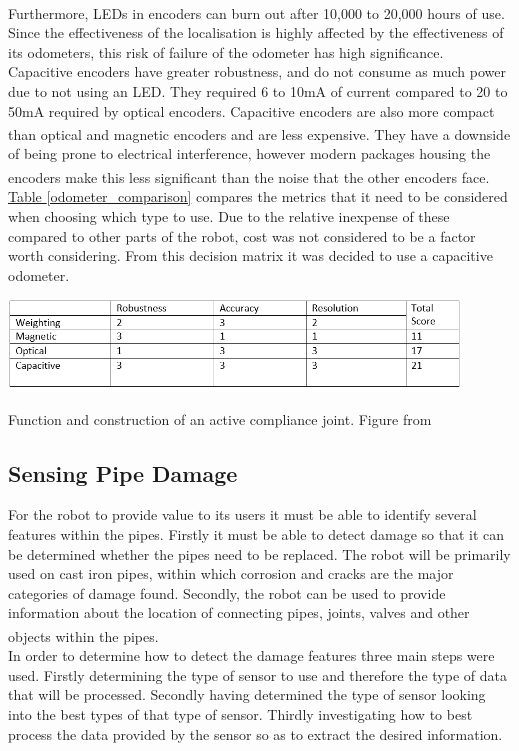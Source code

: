 \documentclass[11pt]{article}		%
\newcommand{\supercite}[1]{\textsuperscript{\cite{#1}}}		%
\newcommand{\tableref}[1]{\hyperref[#1]{Table \ref*{#1}}}     %
\begin{document}
	        Furthermore, LEDs in encoders can burn out after 10,000 to 20,000 hours of use.\supercite{Encoders} 
	        Since the effectiveness of the localisation is highly affected by  the effectiveness of its odometers, this risk of failure of the odometer has high significance.
	        \\
	        Capacitive encoders have greater robustness, and do not consume as much power due to not using an LED. 
	        They required 6 to 10mA of current compared to 20 to 50mA required by optical encoders.
	        Capacitive encoders are also more compact than optical and magnetic encoders and are less expensive\supercite{Encoders}. 
	        They have a downside of being prone to electrical interference, however modern packages housing the encoders make this less significant than the noise that the other encoders face.\supercite{Encoders}
	        \\
	        \tableref{odometer_comparison} compares the metrics that it need to be considered when choosing which type to use. 
	        Due to the relative inexpense of these compared to other parts of the robot, cost was not considered to be a factor worth considering. 
	        From this decision matrix it was decided to use a capacitive odometer. 
	        \begin{table}[h]
						\centering
							\includegraphics[width=0.9\textwidth]{Table_comparing_odometer_encoders.PNG}
							\caption{Function and construction of an active compliance joint. Figure from \cite{park2010normal}}
							\label{odometer_comparison}
					\end{table}
	
	        \subsection{Sensing Pipe Damage}
	        
	        For the robot to provide value to its users it must be able to identify several features within the pipes. 
	        Firstly it must be able to detect damage so that it can be determined whether the pipes need to be replaced.
	        The robot will be primarily used on cast iron pipes, within which corrosion and cracks are the major categories of damage found.  
	        Secondly, the robot can be used to provide information about the location of connecting pipes, joints, valves and other objects within the pipes.\supercite{Failure_pipes}\supercite{Failure_pipes2}
	        \\
	        In order to determine how to detect the damage features three main steps were used. 
	        Firstly determining the type of sensor to use and therefore the type of data that will be processed. 
	        Secondly having determined the type of sensor looking into the best types of that type of sensor. 
	        Thirdly investigating how to best process the data provided by the sensor so as to extract the desired information.
	        
\end{document}
